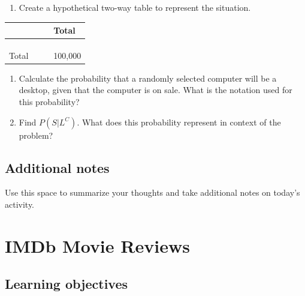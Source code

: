\documentclass[
]{report}
\providecommand{\tightlist}{%
  \setlength{\itemsep}{0pt}\setlength{\parskip}{0pt}}
\begin{document}
\begin{enumerate}
\def\labelenumi{\alph{enumi}.}
\setcounter{enumi}{1}
\tightlist
\item
  Create a hypothetical two-way table to represent the situation.
\end{enumerate}

\begin{longtable}[]{@{}llll@{}}
\toprule
\hspace{1in} & \hspace{1in} & \hspace{1in} & Total\tabularnewline
\midrule
\endhead
\hspace{1in} & & &\tabularnewline
\hspace{1in} & & &\tabularnewline
\hspace{1in} & & &\tabularnewline
Total & & & 100,000\tabularnewline
\bottomrule
\end{longtable}

\begin{enumerate}
\def\labelenumi{\alph{enumi}.}
\setcounter{enumi}{2}
\item
  Calculate the probability that a randomly selected computer will be a desktop, given that the computer is on sale. What is the notation used for this probability?
  \vspace{.8in}
\item
  Find \(P(S | L^C)\). What does this probability represent in context of the problem?
  \vspace{1in}
\end{enumerate}

\hypertarget{additional-notes}{%
\section{Additional notes}\label{additional-notes}}

Use this space to summarize your thoughts and take additional notes on today's activity.

\hypertarget{imdb-movie-reviews}{%
\chapter{IMDb Movie Reviews}\label{imdb-movie-reviews}}

\hypertarget{learning-objectives}{%
\section{Learning objectives}\label{learning-objectives}}
\end{document}

